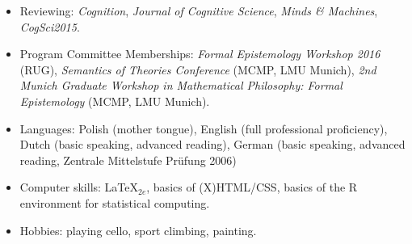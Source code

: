 \documentclass[a4paper,12pt]{article}
\begin{document}
\begin{small}
\begin{itemize}
    \item Reviewing: \emph{Cognition}, \emph{Journal of Cognitive Science}, \emph{Minds \& Machines}, \emph{CogSci2015}.
    
    \item Program Committee Memberships: \emph{Formal Epistemology Workshop 2016} (RUG), \emph{Semantics of Theories Conference} (MCMP, LMU Munich), \emph{2nd Munich Graduate Workshop in Mathematical Philosophy: Formal Epistemology} (MCMP, LMU Munich).
  \end{itemize}




  \begin{itemize}
  \item Languages: Polish (mother tongue), English (full professional proficiency), Dutch
    (basic speaking, advanced reading), German (basic speaking, advanced reading, Zentrale
    Mittelstufe Pr\"ufung 2006)
  \item Computer skills: \LaTeX$_{2e}$, basics of
    (X)HTML/CSS, basics of the R environment for statistical
    computing.

  \item Hobbies: playing cello, sport climbing, painting.
  \end{itemize}


\end{small}
\end{document}
